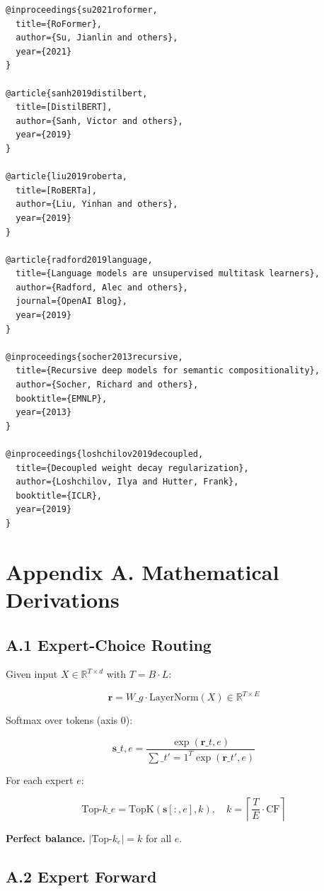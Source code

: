 \begin{lstlisting}
@inproceedings{su2021roformer,
  title={RoFormer},
  author={Su, Jianlin and others},
  year={2021}
}

@article{sanh2019distilbert,
  title=[DistilBERT],
  author={Sanh, Victor and others},
  year={2019}
}

@article{liu2019roberta,
  title=[RoBERTa],
  author={Liu, Yinhan and others},
  year={2019}
}

@article{radford2019language,
  title={Language models are unsupervised multitask learners},
  author={Radford, Alec and others},
  journal={OpenAI Blog},
  year={2019}
}

@inproceedings{socher2013recursive,
  title={Recursive deep models for semantic compositionality},
  author={Socher, Richard and others},
  booktitle={EMNLP},
  year={2013}
}

@inproceedings{loshchilov2019decoupled,
  title={Decoupled weight decay regularization},
  author={Loshchilov, Ilya and Hutter, Frank},
  booktitle={ICLR},
  year={2019}
}
\end{lstlisting}



\section{Appendix A. Mathematical Derivations}

\subsection{A.1 Expert-Choice Routing}

Given input $X \in \mathbb{R}^{T \times d}$ with $T = B \cdot L$:

\[
\mathbf{r} = W\_g \cdot \text{LayerNorm}(X) \in \mathbb{R}^{T \times E}
\tag{A.1}
\]

Softmax over tokens (axis 0):

\[
\mathbf{s}\_{t, e} = \frac{\exp(\mathbf{r}\_{t, e})}{\sum\_{t'=1}^{T} \exp(\mathbf{r}\_{t', e})}
\tag{A.2}
\]

For each expert $e$:

\[
\text{Top-}k\_e = \text{TopK}(\mathbf{s}[:, e], k), \quad k = \left\lceil \frac{T}{E} \cdot \text{CF} \right\rceil
\tag{A.3}
\]

\textbf{Perfect balance.} $|\text{Top-}k_e| = k$ for all $e$.

\subsection{A.2 Expert Forward}

